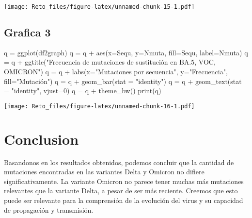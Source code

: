 \documentclass[
]{article}
\newenvironment{Shaded}{\begin{snugshade}}{\end{snugshade}}
\newcommand{\AttributeTok}[1]{\textcolor[rgb]{0.77,0.63,0.00}{#1}}
\newcommand{\DecValTok}[1]{\textcolor[rgb]{0.00,0.00,0.81}{#1}}
\newcommand{\FunctionTok}[1]{\textcolor[rgb]{0.00,0.00,0.00}{#1}}
\newcommand{\NormalTok}[1]{#1}
\newcommand{\OtherTok}[1]{\textcolor[rgb]{0.56,0.35,0.01}{#1}}
\newcommand{\SpecialCharTok}[1]{\textcolor[rgb]{0.00,0.00,0.00}{#1}}
\newcommand{\StringTok}[1]{\textcolor[rgb]{0.31,0.60,0.02}{#1}}
\begin{document}
\texttt{[image: Reto\_files/figure-latex/unnamed-chunk-15-1.pdf]}

\hypertarget{grafica-3-1}{%
\subsection{Grafica 3}\label{grafica-3-1}}

\begin{Shaded}
\begin{Highlighting}[]
\NormalTok{q }\OtherTok{=} \FunctionTok{ggplot}\NormalTok{(df2graph)}
\NormalTok{q }\OtherTok{=}\NormalTok{ q }\SpecialCharTok{+} \FunctionTok{aes}\NormalTok{(}\AttributeTok{x=}\NormalTok{Sequ, }\AttributeTok{y=}\NormalTok{Nmuta, }\AttributeTok{fill=}\NormalTok{Sequ, }\AttributeTok{label=}\NormalTok{Nmuta)}
\NormalTok{q }\OtherTok{=}\NormalTok{ q }\SpecialCharTok{+} \FunctionTok{ggtitle}\NormalTok{(}\StringTok{"Frecuencia de mutaciones de sustitución en BA.5, VOC, OMICRON"}\NormalTok{)}
\NormalTok{q }\OtherTok{=}\NormalTok{ q }\SpecialCharTok{+} \FunctionTok{labs}\NormalTok{(}\AttributeTok{x=}\StringTok{"Mutaciones por secuencia"}\NormalTok{, }\AttributeTok{y=}\StringTok{"Frecuencia"}\NormalTok{, }\AttributeTok{fill=}\StringTok{"Mutación"}\NormalTok{)}
\NormalTok{q }\OtherTok{=}\NormalTok{ q }\SpecialCharTok{+} \FunctionTok{geom\_bar}\NormalTok{(}\AttributeTok{stat =} \StringTok{"identity"}\NormalTok{)}
\NormalTok{q }\OtherTok{=}\NormalTok{ q }\SpecialCharTok{+} \FunctionTok{geom\_text}\NormalTok{(}\AttributeTok{stat =} \StringTok{"identity"}\NormalTok{, }\AttributeTok{vjust=}\DecValTok{0}\NormalTok{)}
\NormalTok{q }\OtherTok{=}\NormalTok{ q }\SpecialCharTok{+} \FunctionTok{theme\_bw}\NormalTok{()}
\FunctionTok{print}\NormalTok{(q)}
\end{Highlighting}
\end{Shaded}

\texttt{[image: Reto\_files/figure-latex/unnamed-chunk-16-1.pdf]}

\hypertarget{conclusion}{%
\section{Conclusion}\label{conclusion}}

Basandonos en los resultados obtenidos, podemos concluir que la cantidad
de mutaciones encontradas en las variantes Delta y Omicron no difiere
significativamente. La variante Omicron no parece tener muchas más
mutaciones relevantes que la variante Delta, a pesar de ser más
reciente. Creemos que esto puede ser relevante para la comprensión de la
evolución del virus y su capacidad de propagación y transmisión.
\end{document}
